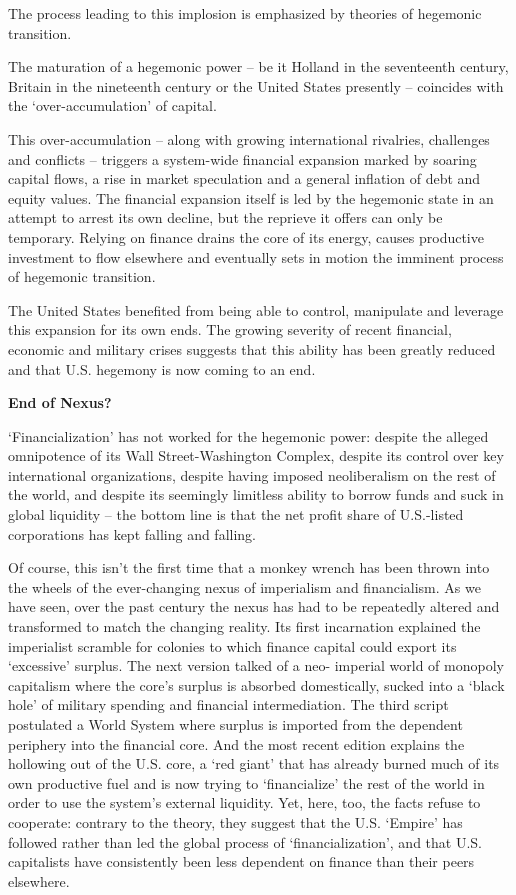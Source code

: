 \documentclass[
]{book}
\begin{document}
The process leading to this implosion is emphasized by theories of hegemonic
transition.

The maturation of a hegemonic power -- be it Holland in the
seventeenth century, Britain in the nineteenth century or the United States presently --
coincides with the `over-accumulation' of capital.

This over-accumulation -- along with growing international rivalries,
challenges and conflicts -- triggers a system-wide financial expansion marked by soaring
capital flows, a rise in market speculation and a general inflation of debt and equity
values.
The financial expansion itself is led by the hegemonic state in an attempt to
arrest its own decline, but the reprieve it offers can only be temporary. Relying on finance
drains the core of its energy, causes productive investment to flow elsewhere and
eventually sets in motion the imminent process of hegemonic transition.

The United States benefited from being able to control,
manipulate and leverage this expansion for its own ends.
The growing severity of recent financial, economic and military crises suggests
that this ability has been greatly reduced and that U.S. hegemony is now coming to an end.

\textbf{End of Nexus?}

`Financialization' has not worked for the hegemonic power: despite the alleged
omnipotence of its Wall Street-Washington Complex, despite its control over key
international organizations, despite having imposed neoliberalism on the rest of the
world, and despite its seemingly limitless ability to borrow funds and suck in global
liquidity -- the bottom line is that the net profit share of U.S.-listed corporations has kept
falling and falling.

Of course, this isn't the first time that a monkey wrench has been thrown into the wheels
of the ever-changing nexus of imperialism and financialism. As we have seen, over the past
century the nexus has had to be repeatedly altered and transformed to match the
changing reality. Its first incarnation explained the imperialist scramble for colonies to
which finance capital could export its `excessive' surplus. The next version talked of a neo-
imperial world of monopoly capitalism where the core's surplus is absorbed domestically,
sucked into a `black hole' of military spending and financial intermediation. The third
script postulated a World System where surplus is imported from the dependent
periphery into the financial core. And the most recent edition explains the hollowing out
of the U.S. core, a `red giant' that has already burned much of its own productive fuel and
is now trying to `financialize' the rest of the world in order to use the system's external
liquidity.
Yet, here, too, the facts refuse to cooperate: contrary to the theory, they suggest
that the U.S. `Empire' has followed rather than led the global process of `financialization',
and that U.S. capitalists have consistently been less dependent on finance than their peers
elsewhere.
\end{document}
